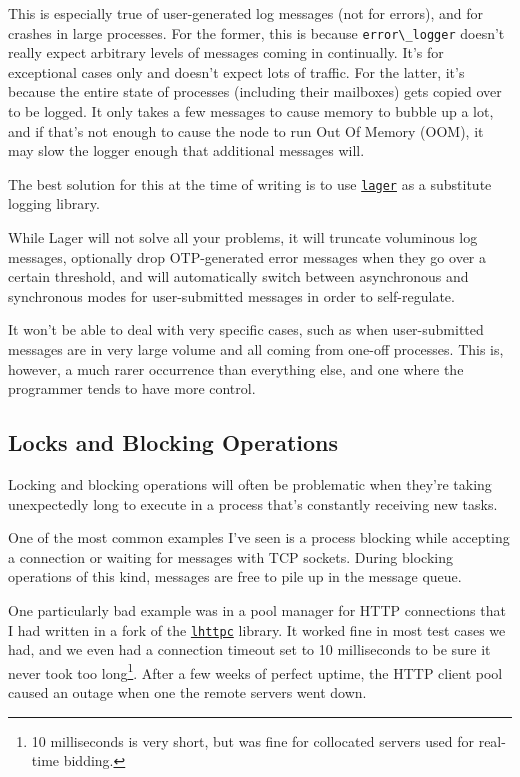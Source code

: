 \documentclass[11pt, oneside]{book}   	%
\newcommand{\module}[1]{\Verb`#1`}
\begin{document}
This is especially true of user-generated log messages (not for errors), and for crashes in large processes. For the former, this is because \module{error\_logger} doesn't really expect arbitrary levels of messages coming in continually. It's for exceptional cases only and doesn't expect lots of traffic. For the latter, it's because the entire state of processes (including their mailboxes) gets copied over to be logged. It only takes a few messages to cause memory to bubble up a lot, and if that's not enough to cause the node to run Out Of Memory (OOM), it may slow the logger enough that additional messages will.

The best solution for this at the time of writing is to use \href{https://github.com/basho/lager}{\module{lager}} as a substitute logging library.

While Lager will not solve all your problems, it will truncate voluminous log messages, optionally drop OTP-generated error messages when they go over a certain threshold, and will automatically switch between asynchronous and synchronous modes for user-submitted messages in order to self-regulate.

It won't be able to deal with very specific cases, such as when user-submitted messages are in very large volume and all coming from one-off processes. This is, however, a much rarer occurrence than everything else, and one where the programmer tends to have more control.


\subsection{Locks and Blocking Operations}

Locking and blocking operations will often be problematic when they're taking unexpectedly long to execute in a process that's constantly receiving new tasks.

One of the most common examples I've seen is a process blocking while accepting a connection or waiting for messages with TCP sockets. During blocking operations of this kind, messages are free to pile up in the message queue.

One particularly bad example was in a pool manager for HTTP connections that I had written in a fork of the \href{https://github.com/ferd/lhttpc}{\module{lhttpc}} library. It worked fine in most test cases we had, and we even had a connection timeout set to 10 milliseconds to be sure it never took too long\footnote{10 milliseconds is very short, but was fine for collocated servers used for real-time bidding.}. After a few weeks of perfect uptime, the HTTP client pool caused an outage when one the remote servers went down.
\end{document}
